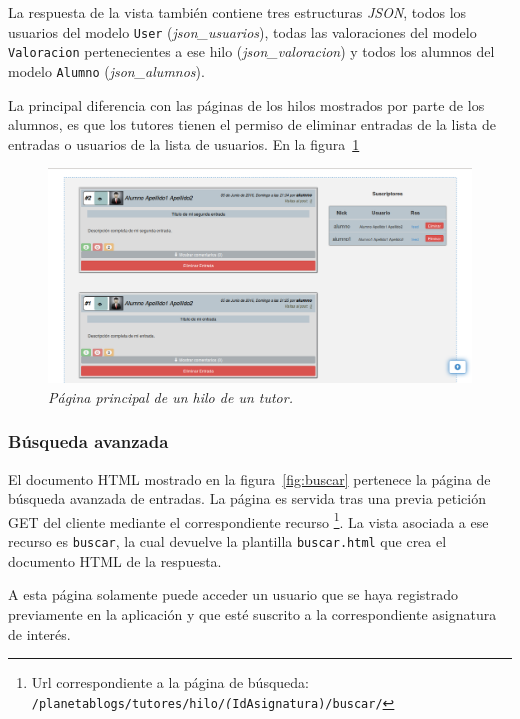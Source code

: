 \documentclass[a4paper, 12pt]{book}
\begin{document}
La respuesta de la vista tambi\'en contiene tres estructuras \textit{JSON}, todos los usuarios del modelo \texttt{User} (\textit{json\_usuarios}), 
todas las valoraciones del modelo \texttt{Valoracion} pertenecientes a ese hilo (\textit{json\_valoracion}) y todos los alumnos del modelo \texttt{Alumno} 
(\textit{json\_alumnos}).

La principal diferencia con las p\'aginas de los hilos mostrados por parte de los alumnos, es que los tutores tienen el permiso de eliminar entradas de la 
lista de entradas o usuarios de la lista de usuarios.
En la figura~\ref{fig:hilotutor}
\begin{figure}
  \centering
  \includegraphics[width=17cm, keepaspectratio]{imagenes/HiloTutorEntradas}
  \caption{\textit{P\'agina principal de un hilo de un tutor.}}
  \label{fig:hilotutor}
\end{figure}


\subsubsection{B\'usqueda avanzada} 
\label{sec:buscar}
El documento HTML mostrado en la figura~\ref{fig:buscar} pertenece la p\'agina de b\'usqueda avanzada de entradas. 
La p\'agina es servida tras una previa petici\'on GET del cliente mediante el correspondiente recurso \footnote{Url correspondiente a la p\'agina de 
b\'usqueda: \texttt{/planetablogs/tutores/hilo/\textit(IdAsignatura)/buscar/}}. La vista asociada a ese recurso es \texttt{buscar}, la cual 
devuelve la plantilla \texttt{buscar.html} que crea el documento HTML de la respuesta.

A esta p\'agina solamente puede acceder un usuario que se haya registrado previamente en la aplicaci\'on y que est\'e suscrito a la correspondiente 
asignatura de inter\'es.
\end{document}
